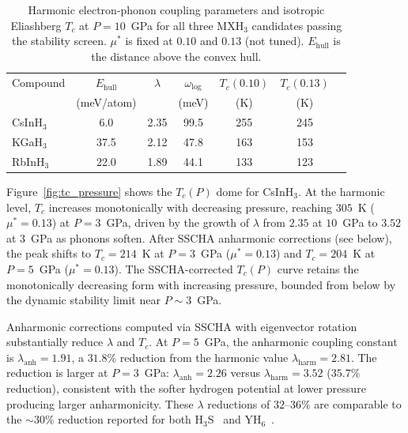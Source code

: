 \begin{table}[b]
\caption{%
  Harmonic electron-phonon coupling parameters and isotropic Eliashberg
  $T_c$ at $P = 10$~GPa for all three MXH$_3$ candidates passing the
  stability screen. $\mu^*$ is fixed at $0.10$ and $0.13$
  (not tuned).
  $E_{\mathrm{hull}}$ is the distance above the convex hull.%
}
\label{tab:candidates}
\begin{ruledtabular}
\begin{tabular}{lcccccc}
Compound & $E_{\mathrm{hull}}$ & $\lambda$ & $\omega_{\mathrm{log}}$ &
  $T_c(0.10)$ & $T_c(0.13)$ \\
 & (meV/atom) & & (meV) & (K) & (K) \\
\hline
CsInH$_3$ & 6.0  & 2.35 & 99.5  & 255 & 245 \\
KGaH$_3$  & 37.5 & 2.12 & 47.8  & 163 & 153 \\
RbInH$_3$ & 22.0 & 1.89 & 44.1  & 133 & 123 \\
\end{tabular}
\end{ruledtabular}
\end{table}


Figure~\ref{fig:tc_pressure} shows the $T_c(P)$ dome for CsInH$_3$.
At the harmonic level, $T_c$ increases monotonically with decreasing
pressure, reaching $305$~K ($\mu^* = 0.13$) at $P = 3$~GPa, driven by
the growth of $\lambda$ from $2.35$ at $10$~GPa to $3.52$ at $3$~GPa as
phonons soften. After SSCHA anharmonic corrections (see below),
the peak shifts to $T_c = 214$~K at $P = 3$~GPa ($\mu^* = 0.13$) and
$T_c = 204$~K at $P = 5$~GPa ($\mu^* = 0.13$). The SSCHA-corrected
$T_c(P)$ curve retains the monotonically decreasing form with
increasing pressure, bounded from below by the dynamic stability limit
near $P \sim 3$~GPa.


Anharmonic corrections computed via SSCHA with eigenvector
rotation~\cite{Errea2020,Belli2025} substantially reduce $\lambda$ and
$T_c$. At $P = 5$~GPa, the anharmonic coupling constant is
$\lambda_{\mathrm{anh}} = 1.91$, a $31.8\%$ reduction from the harmonic
value $\lambda_{\mathrm{harm}} = 2.81$. The reduction is larger at
$P = 3$~GPa: $\lambda_{\mathrm{anh}} = 2.26$ versus
$\lambda_{\mathrm{harm}} = 3.52$ ($35.7\%$ reduction), consistent with
the softer hydrogen potential at lower pressure producing larger
anharmonicity. These $\lambda$ reductions of $32$--$36\%$ are comparable
to the $\sim 30\%$ reduction reported for both H$_3$S~\cite{Errea2015}
and YH$_6$~\cite{Belli2025}.

